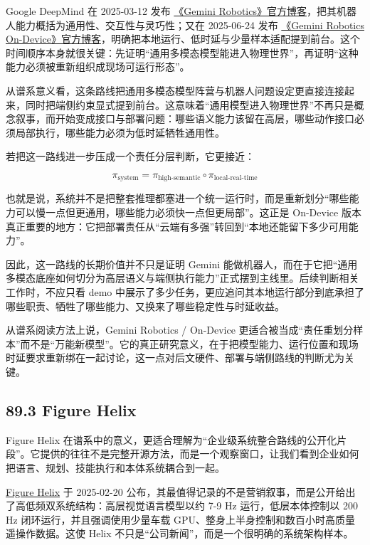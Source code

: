 Google DeepMind 在 2025-03-12 发布 \href{https://deepmind.google/discover/blog/gemini-robotics-brings-ai-into-the-physical-world/}{《Gemini Robotics》官方博客}，把其机器人能力概括为通用性、交互性与灵巧性；又在 2025-06-24 发布 \href{https://deepmind.google/discover/blog/gemini-robotics-on-device-brings-ai-to-local-robotic-devices/}{《Gemini Robotics On-Device》官方博客}，明确把本地运行、低时延与少量样本适配提到前台。这个时间顺序本身就很关键：先证明“通用多模态模型能进入物理世界”，再证明“这种能力必须被重新组织成现场可运行形态”。

从谱系意义看，这条路线把通用多模态模型阵营与机器人问题设定更直接连接起来，同时把端侧约束显式提到前台。这意味着“通用模型进入物理世界”不再只是概念叙事，而开始变成接口与部署问题：哪些语义能力该留在高层，哪些动作接口必须局部执行，哪些能力必须为低时延牺牲通用性。

若把这一路线进一步压成一个责任分层判断，它更接近：

\begingroup
\footnotesize
\begin{equation*}
\pi_{\text{system}}
=
\pi_{\text{high-semantic}}
\circ
\pi_{\text{local-real-time}}
\end{equation*}
\endgroup

也就是说，系统并不是把整套推理都塞进一个统一运行时，而是重新划分“哪些能力可以慢一点但更通用，哪些能力必须快一点但更局部”。这正是 On-Device 版本真正重要的地方：它把部署责任从“云端有多强”转回到“本地还能留下多少可用能力”。

因此，这一路线的长期价值并不只是证明 Gemini 能做机器人，而在于它把“通用多模态底座如何切分为高层语义与端侧执行能力”正式摆到主线里。后续判断相关工作时，不应只看 demo 中展示了多少任务，更应追问其本地运行部分到底承担了哪些职责、牺牲了哪些能力、又换来了哪些稳定性与时延收益。

从谱系阅读方法上说，Gemini Robotics / On-Device 更适合被当成“责任重划分样本”而不是“万能新模型”。它的真正研究意义，在于把模型能力、运行位置和现场时延要求重新绑在一起讨论，这一点对后文硬件、部署与端侧路线的判断尤为关键。

\subsection*{89.3 Figure Helix}


Figure Helix 在谱系中的意义，更适合理解为“企业级系统整合路线的公开化片段”。它提供的往往不是完整开源方法，而是一个观察窗口，让我们看到企业如何把语言、规划、技能执行和本体系统耦合到一起。

\href{https://www.figure.ai/news/helix}{Figure Helix} 于 2025-02-20 公布，其最值得记录的不是营销叙事，而是公开给出了高低频双系统结构：高层视觉语言模型以约 7-9 Hz 运行，低层本体控制以 200 Hz 闭环运行，并且强调使用少量车载 GPU、整身上半身控制和数百小时高质量遥操作数据。这使 Helix 不只是“公司新闻”，而是一个很明确的系统架构样本。


